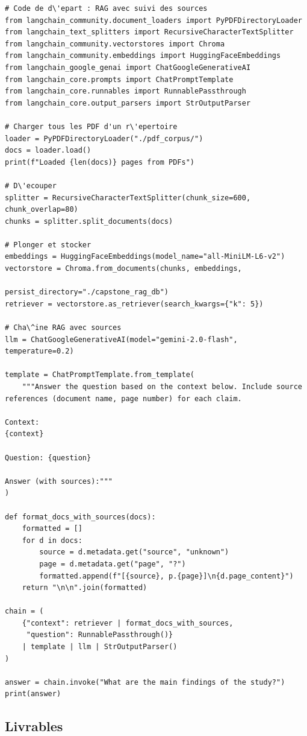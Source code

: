 \begin{verbatim}
# Code de d\'epart : RAG avec suivi des sources
from langchain_community.document_loaders import PyPDFDirectoryLoader
from langchain_text_splitters import RecursiveCharacterTextSplitter
from langchain_community.vectorstores import Chroma
from langchain_community.embeddings import HuggingFaceEmbeddings
from langchain_google_genai import ChatGoogleGenerativeAI
from langchain_core.prompts import ChatPromptTemplate
from langchain_core.runnables import RunnablePassthrough
from langchain_core.output_parsers import StrOutputParser

# Charger tous les PDF d'un r\'epertoire
loader = PyPDFDirectoryLoader("./pdf_corpus/")
docs = loader.load()
print(f"Loaded {len(docs)} pages from PDFs")

# D\'ecouper
splitter = RecursiveCharacterTextSplitter(chunk_size=600, chunk_overlap=80)
chunks = splitter.split_documents(docs)

# Plonger et stocker
embeddings = HuggingFaceEmbeddings(model_name="all-MiniLM-L6-v2")
vectorstore = Chroma.from_documents(chunks, embeddings,
                                     persist_directory="./capstone_rag_db")
retriever = vectorstore.as_retriever(search_kwargs={"k": 5})

# Cha\^ine RAG avec sources
llm = ChatGoogleGenerativeAI(model="gemini-2.0-flash", temperature=0.2)

template = ChatPromptTemplate.from_template(
    """Answer the question based on the context below. Include source
references (document name, page number) for each claim.

Context:
{context}

Question: {question}

Answer (with sources):"""
)

def format_docs_with_sources(docs):
    formatted = []
    for d in docs:
        source = d.metadata.get("source", "unknown")
        page = d.metadata.get("page", "?")
        formatted.append(f"[{source}, p.{page}]\n{d.page_content}")
    return "\n\n".join(formatted)

chain = (
    {"context": retriever | format_docs_with_sources,
     "question": RunnablePassthrough()}
    | template | llm | StrOutputParser()
)

answer = chain.invoke("What are the main findings of the study?")
print(answer)
\end{verbatim}

\subsection{Livrables}


